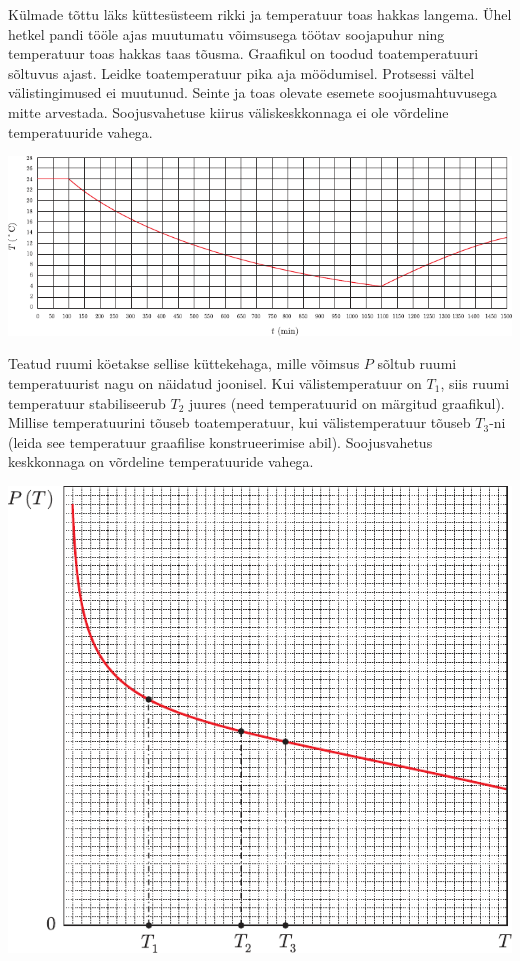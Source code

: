 \documentclass[10pt]{article}
\begin{document}
{%

Külmade tõttu läks küttesüsteem rikki ja temperatuur toas hakkas langema. Ühel hetkel pandi tööle ajas muutumatu võimsusega töötav soojapuhur ning temperatuur toas hakkas taas tõusma. Graafikul on toodud toatemperatuuri sõltuvus ajast. Leidke toatemperatuur pika aja möödumisel. Protsessi vältel välistingimused ei muutunud. Seinte ja toas olevate esemete soojusmahtuvusega mitte arvestada. Soojusvahetuse kiirus väliskeskkonnaga ei ole võrdeline temperatuuride vahega.

\begin{center}
	\includegraphics[width=\linewidth]{2006-v3g-07-yl}
\end{center}
\probend
\bigskip


Teatud ruumi köetakse sellise küttekehaga, mille võimsus $P$ sõltub ruumi temperatuurist nagu on näidatud joonisel. Kui välistemperatuur on $T_1$, siis ruumi temperatuur stabiliseerub $T_2$ juures (need temperatuurid on märgitud graafikul). Millise temperatuurini tõuseb toatemperatuur, kui välistemperatuur tõuseb $T_3$-ni (leida see temperatuur graafilise konstrueerimise abil). Soojusvahetus keskkonnaga on võrdeline temperatuuride vahega.

\begin{center}
	\includegraphics[width=0.8\linewidth]{2007-v3g-07-yl}
\end{center}
\probend
\bigskip

}
\end{document}
